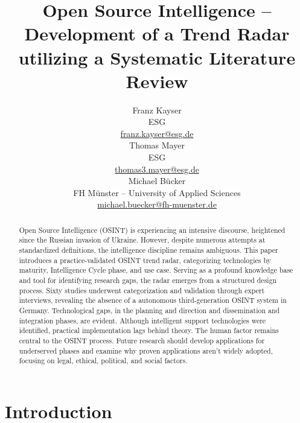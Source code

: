 \documentclass[10pt]{article}
\title{Open Source Intelligence -- Development of a Trend Radar utilizing a Systematic Literature Review}
\author{Franz Kayser \\
  ESG \\
  {\underline{ franz.kayser@esg.de}} \\\And
  Thomas Mayer \\
  ESG  \\
  {\underline{ thomas3.mayer@esg.de} }\\\And 
  Michael Bücker \\
  FH Münster -- University of Applied Sciences\\
  {\underline{michael.buecker@fh-muenster.de}} \\}
\date{}
\begin{document}
\maketitle
\begin{abstract}
    Open Source Intelligence (OSINT) is experiencing an intensive discourse,
    heightened since the Russian invasion of Ukraine. However, despite numerous attempts
    at standardized definitions, the intelligence discipline remains ambiguous. This paper
    introduces a practice-validated OSINT trend radar, categorizing technologies by maturity,
    Intelligence Cycle phase, and use case. Serving as a profound knowledge base and tool for
    identifying research gaps, the radar emerges from a structured design process. Sixty
    studies underwent categorization and validation through expert interviews,
    revealing the absence of a autonomous third-generation OSINT
    system in Germany. Technological gaps, in the planning and direction and
    dissemination and integration phases, are evident. Although intelligent support
    technologies were identified, practical implementation lags behind theory. The human
    factor remains central to the OSINT process. Future research should develop
    applications for underserved phases and examine why proven applications aren't widely
    adopted, focusing on legal, ethical, political, and social factors.
\end{abstract}

\section{Introduction} \label{sec:introduction}
\end{document}
